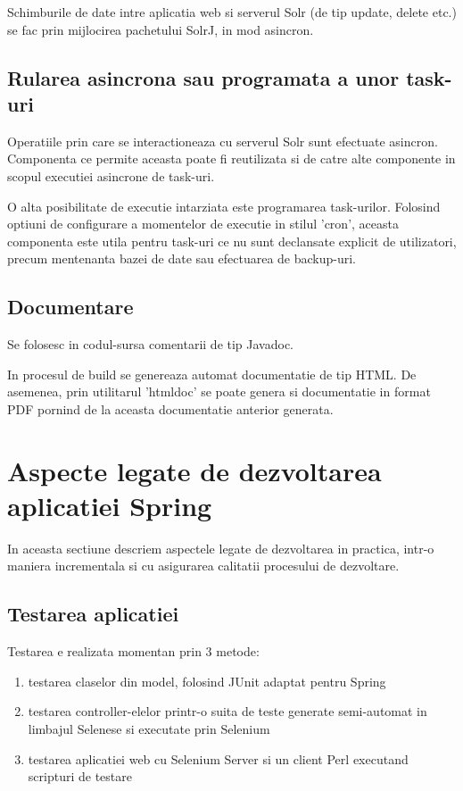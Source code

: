 Schimburile de date intre aplicatia web si serverul Solr (de tip update, delete
etc.) se fac prin mijlocirea pachetului SolrJ, in mod asincron.

\subsection{Rularea asincrona sau programata a unor task-uri}
Operatiile prin care se interactioneaza cu serverul Solr sunt efectuate
asincron. Componenta ce permite aceasta poate fi reutilizata si de catre alte
componente in scopul executiei asincrone de task-uri.

O alta posibilitate de executie intarziata este programarea task-urilor.
Folosind optiuni de configurare a momentelor de executie in stilul 'cron',
aceasta componenta este utila pentru task-uri ce nu sunt declansate explicit de
utilizatori, precum mentenanta bazei de date sau efectuarea de backup-uri.

\subsection{Documentare}
Se folosesc in codul-sursa comentarii de tip Javadoc. 

In procesul de build se genereaza automat documentatie  de tip HTML. 
De asemenea, prin utilitarul 'htmldoc' se poate genera
si documentatie in format PDF pornind de la aceasta documentatie anterior
generata.

\section{Aspecte legate de dezvoltarea aplicatiei Spring}
In aceasta sectiune descriem aspectele legate de dezvoltarea in practica, intr-o
maniera incrementala si cu asigurarea calitatii procesului de dezvoltare.

\subsection{Testarea aplicatiei}
Testarea e realizata momentan prin 3 metode:
\begin{enumerate}
  \item testarea claselor din model, folosind JUnit adaptat pentru Spring
  \item testarea controller-elelor printr-o suita de teste generate semi-automat
  in limbajul Selenese si executate prin Selenium
  \item testarea aplicatiei web cu Selenium Server si un client Perl executand
  scripturi de testare
\end{enumerate}

